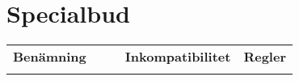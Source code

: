 %
%
%
%

\newcommand{\nonTrump}{\textnormal{icke-trumf-bud}}

\section{Specialbud}
	\begin{center}
			\begin{tabularx}{\textwidth}{
				l
				S[table-number-alignment=center, table-format=1.0]
				S[table-number-alignment=center, table-format=1.0]
				p{3cm}
				|X
			}

			\textbf{Benämning} &
			 &
			 &
			\textbf{Inkompatibilitet} &
			\textbf{Regler}
			\\[-3ex]

		\end{tabularx}
	\end{center}
